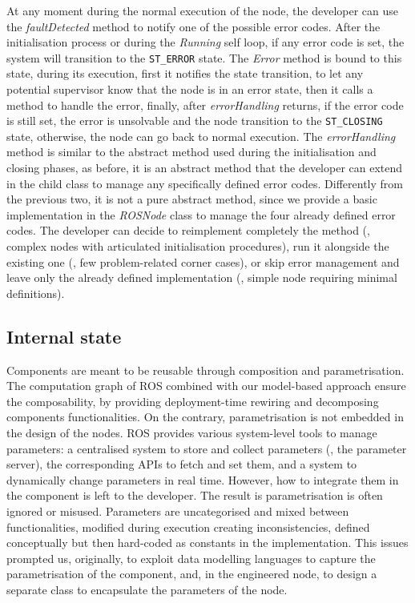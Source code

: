 At any moment during the normal execution of the node, the developer can use the \textit{faultDetected} method to notify one of the possible error codes. After the initialisation process or during the \textit{Running} self loop, if any error code is set, the system will transition to the  \texttt{ST\_ERROR} state. The \textit{Error} method is bound to this state, during its execution, first it notifies the state transition, to let any potential supervisor know that the node is in an error state, then it calls a method to handle the error, finally, after \textit{errorHandling} returns, if the error code is still set, the error is unsolvable and the node transition to the \texttt{ST\_CLOSING} state, otherwise, the node can go back to normal execution. The \textit{errorHandling} method is similar to the abstract method used during the initialisation and closing phases, as before, it is an abstract method that the developer can extend in the child class to manage any specifically defined error codes. Differently from the previous two, it is not a pure abstract method, since we provide a basic implementation in the \textit{ROSNode} class to manage the four already defined error codes. The developer can decide to reimplement completely the method (\eg, complex nodes with articulated initialisation procedures), run it alongside the existing one (\eg, few problem-related corner cases), or skip error management and leave only the already defined implementation (\eg, simple node requiring minimal definitions).

\subsection{Internal state}
Components are meant to be reusable through composition and parametrisation. The computation graph of ROS combined with our model-based approach ensure the composability, by providing deployment-time rewiring and decomposing components functionalities. On the contrary, parametrisation is not embedded in the design of the nodes. ROS provides various system-level tools to manage parameters: a centralised system to store and collect parameters (\ie, the parameter server), the corresponding APIs to fetch and set them, and a system to dynamically change parameters in real time. However, how to integrate them in the component is left to the developer. The result is parametrisation is often ignored or misused. Parameters are uncategorised and mixed between functionalities, modified during execution creating inconsistencies, defined conceptually but then hard-coded as constants in the implementation. This issues prompted us, originally, to exploit data modelling languages to capture the parametrisation of the component, and, in the engineered node, to design a separate class to encapsulate the parameters of the node.

